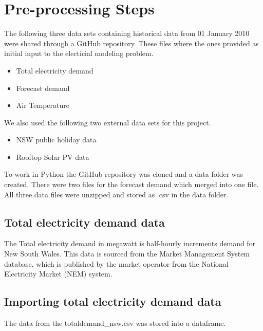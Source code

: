 \documentclass[mstat,12pt]{unswthesis}
\begin{document}
\hypertarget{pre-processing-steps}{%
\section{Pre-processing Steps}\label{pre-processing-steps}}

The following three data sets containing historical data from 01 January
2010 were shared through a GitHub repository. These files where the ones
provided as initial input to the electicial modeling problem.\\

\begin{itemize}
\item Total electricity demand
\item Forecast demand
\item Air Temperature
\end{itemize}

We also used the following two external data sets for this project.

\begin{itemize}
\item NSW public holiday data
\item Rooftop Solar PV data
\end{itemize}

To work in Python the GitHub repository was cloned and a data folder was
created. There were two files for the forecast demand which merged into
one file. All three data files were unzipped and stored as .csv in the
data folder.

\hypertarget{total-electricity-demand-data}{%
\subsection{Total electricity demand
data}\label{total-electricity-demand-data}}

The Total electricity demand in megawatt is half-hourly increments
demand for New South Wales. This data is sourced from the Market
Management System database, which is published by the market operator
from the National Electricity Market (NEM) system.

\hypertarget{importing-total-electricity-demand-data}{%
\subsection{Importing total electricity demand
data}\label{importing-total-electricity-demand-data}}

The data from the totaldemand\_nsw.csv was stored into a dataframe.
\end{document}
